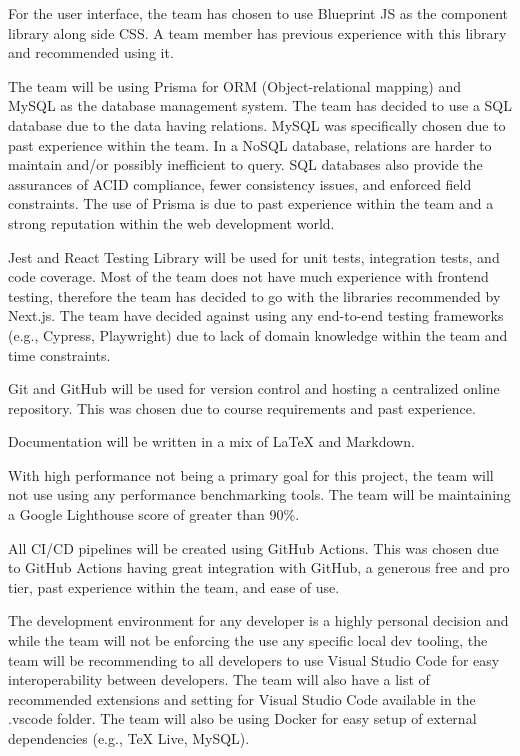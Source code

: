 \documentclass{article}
\begin{document}
For the user interface, the team has chosen to use Blueprint JS as the component library along side CSS. A
team member has previous experience with this library and recommended using it.

The team will be using Prisma for ORM (Object-relational mapping) and MySQL as the database management
system. The team has decided to use a SQL database due to the data having relations. MySQL was
specifically chosen due to past experience within the team. In a NoSQL database, relations are
harder to maintain and/or possibly inefficient to query. SQL databases also provide the assurances
of ACID compliance, fewer consistency issues, and enforced field constraints. The use of Prisma is
due to past experience within the team and a strong reputation within the web development world.

Jest and React Testing Library will be used for unit tests, integration tests, and code
coverage. Most of the team does not have much experience with frontend testing, therefore the team has
decided to go with the libraries recommended by Next.js. The team have decided against using any
end-to-end testing frameworks (e.g., Cypress, Playwright) due to lack of domain knowledge within the
team and time constraints.

Git and GitHub will be used for version control and hosting a centralized online repository. This
was chosen due to course requirements and past experience.

Documentation will be written in a mix of \LaTeX{} and Markdown.

With high performance not being a primary goal for this project, the team will not use using any
performance benchmarking tools. The team will be maintaining a Google Lighthouse score of greater than
90\%.

All CI/CD pipelines will be created using GitHub Actions. This was chosen due to GitHub Actions
having great integration with GitHub, a generous free and pro tier, past experience within the team,
and ease of use.

The development environment for any developer is a highly personal decision and while the team will not be
enforcing the use any specific local dev tooling, the team will be recommending to all developers to use
Visual Studio Code for easy interoperability between developers. The team will also have a list of
recommended extensions and setting for Visual Studio Code available in the .vscode folder. The team will
also be using Docker for easy setup of external dependencies (e.g., TeX Live, MySQL).
\end{document}
